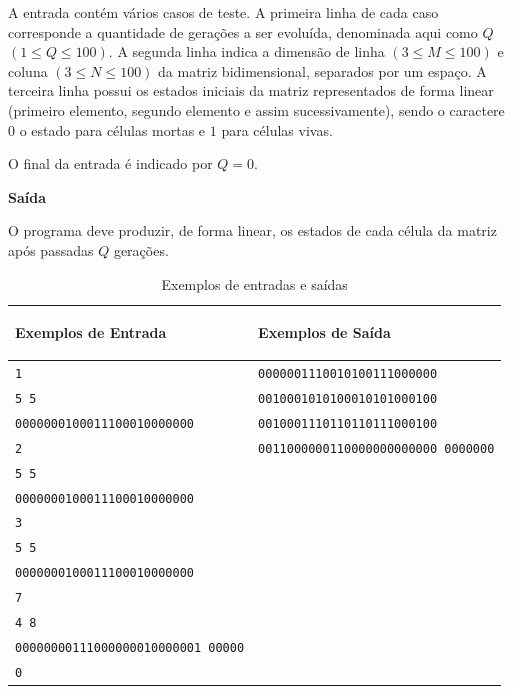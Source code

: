 A entrada contém vários casos de teste. A primeira linha de cada caso corresponde a quantidade de gerações a ser evoluída, denominada aqui como $Q$ $(1 \leq Q \leq 100)$. A segunda linha indica a dimensão de linha $(3 \leq M \leq 100)$ e coluna $(3 \leq N \leq 100)$ da matriz bidimensional, separados por um espaço. A terceira linha possui os estados iniciais da matriz representados de forma linear (primeiro elemento, segundo elemento e assim sucessivamente), sendo o caractere $0$ o estado para células mortas e $1$ para células vivas.

O final da entrada é indicado por $Q = 0$.

\vspace{0.3cm}
\textbf{Saída}

O programa deve produzir, de forma linear, os estados de cada célula da matriz após passadas $Q$ gerações.

\begin{table}[ht]
    \centering
    \begin{tabular}{|p{7cm}|p{7cm}|}
        \hline
        \begin{center}
            \vspace{-0.3cm}
            \textbf{Exemplos de Entrada}
            \vspace{-0.3cm}
        \end{center} 
         &  
        \begin{center}
            \vspace{-0.3cm}
            \textbf{Exemplos de Saída}
            \vspace{-0.3cm}
        \end{center} \\ \hline
         \texttt{1} & \texttt{0000001110010100111000000} \\  
         \texttt{5 5} & \texttt{0010001010100010101000100} \\
         \texttt{0000000100011100010000000} & \texttt{0010001110110110111000100} \\
         \texttt{2} & \texttt{0011000000110000000000000
         0000000} \\
         \texttt{5 5} & \texttt{} \\
         \texttt{0000000100011100010000000} & \texttt{} \\
         \texttt{3} & \texttt{} \\
         \texttt{5 5} & \texttt{} \\  
         \texttt{0000000100011100010000000} & \texttt{} \\
         \texttt{7} & \texttt{} \\
         \texttt{4 8} & \texttt{} \\
         \texttt{00000000111000000010000001
         00000} & \texttt{} \\
         \texttt{0} &  \\ \hline
    \end{tabular}
    \caption{Exemplos de entradas e saídas} 
\end{table}

\newpage

\begin{center}
\noindent

\end{center}